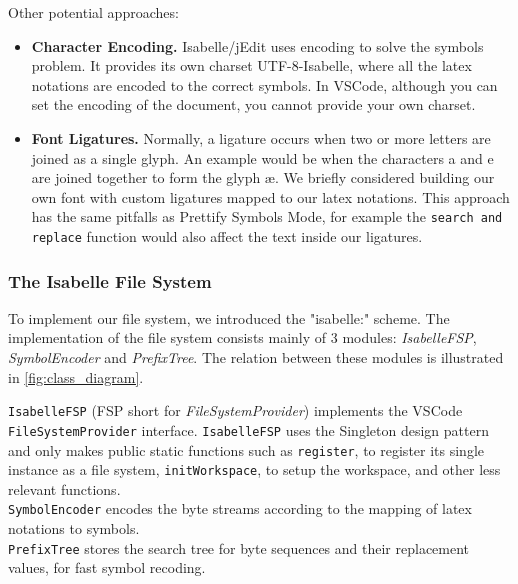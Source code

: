 Other potential approaches:
\begin{itemize}
  \item \textbf{Character Encoding.} Isabelle/jEdit uses encoding to solve the symbols problem. It provides its own charset UTF-8-Isabelle, where all the latex notations are encoded to the correct symbols. In VSCode, although you can set the encoding of the document, you cannot provide your own charset. 
  \item \textbf{Font Ligatures.} Normally, a ligature occurs when two or more letters are joined as a single glyph. An example would be when the characters a and e are joined together to form the glyph \ae. We briefly considered building our own font with custom ligatures mapped to our latex notations. This approach has the same pitfalls as Prettify Symbols Mode, for example the \texttt{search and replace} function would also affect the text inside our ligatures. 
\end{itemize}

\subsubsection*{The Isabelle File System}
To implement our file system, we introduced the "isabelle:" scheme. The implementation of the file system consists mainly of 3 modules: \emph{IsabelleFSP}, \emph{SymbolEncoder} and \emph{PrefixTree}. The relation between these modules is illustrated in \autoref{fig:class_diagram}.

\texttt{IsabelleFSP} (FSP short for \emph{FileSystemProvider}) implements the VSCode \texttt{FileSystemProvider} interface. \texttt{IsabelleFSP} uses the Singleton design pattern and only makes public static functions such as \texttt{register}, to register its single instance as a file system, \texttt{initWorkspace}, to setup the workspace, and other less relevant functions. \\
\texttt{SymbolEncoder} encodes the byte streams according to the mapping of latex notations to symbols.\\
\texttt{PrefixTree} stores the search tree for byte sequences and their replacement values, for fast symbol recoding.\\

